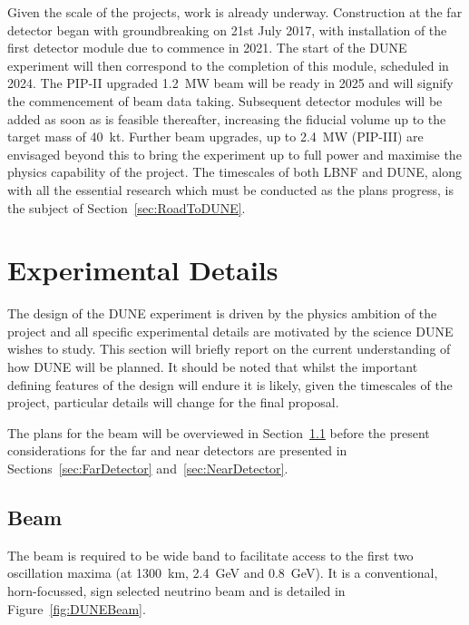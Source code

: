 Given the scale of the projects, work is already underway.  Construction at the far detector began with groundbreaking on 21st July 2017, with installation of the first detector module due to commence in 2021.  The start of the DUNE experiment will then correspond to the completion of this module, scheduled in 2024.  The PIP-II upgraded 1.2~MW beam will be ready in 2025 and will signify the commencement of beam data taking.  Subsequent detector modules will be added as soon as is feasible thereafter, increasing the fiducial volume up to the target mass of 40~kt.  Further beam upgrades, up to 2.4~MW (PIP-III) are envisaged beyond this to bring the experiment up to full power and maximise the physics capability of the project.  The timescales of both LBNF and DUNE, along with all the essential research which must be conducted as the plans progress, is the subject of Section~\ref{sec:RoadToDUNE}.

\section{Experimental Details}\label{sec:DUNEExperiment}

The design of the DUNE experiment is driven by the physics ambition of the project and all specific experimental details are motivated by the science DUNE wishes to study.  This section will briefly report on the current understanding of how DUNE will be planned.  It should be noted that whilst the important defining features of the design will endure it is likely, given the timescales of the project, particular details will change for the final proposal.

The plans for the beam will be overviewed in Section~\ref{sec:DUNEBeam} before the present considerations for the far and near detectors are presented in Sections~\ref{sec:FarDetector} and~\ref{sec:NearDetector}.

\subsection{Beam}\label{sec:DUNEBeam}

The beam is required to be wide band to facilitate access to the first two oscillation maxima (at 1300~km, 2.4~GeV and 0.8~GeV).  It is a conventional, horn-focussed, sign selected neutrino beam and is detailed in Figure~\ref{fig:DUNEBeam}.

